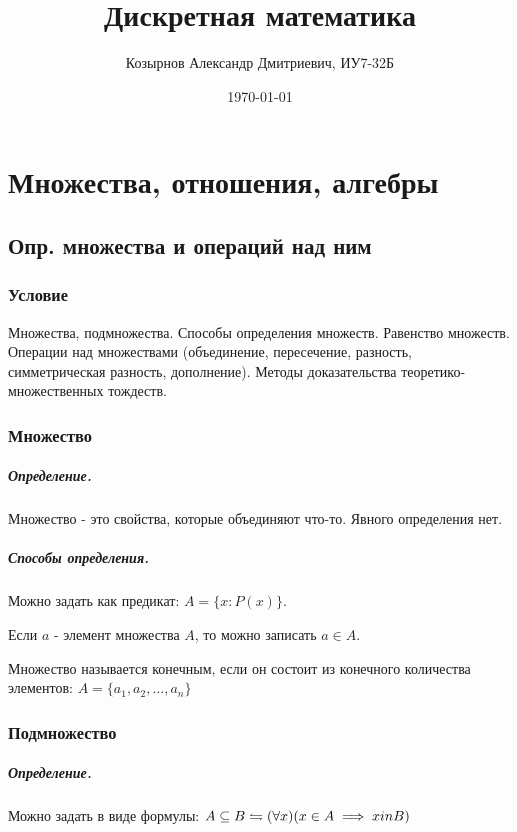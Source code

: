\documentclass{report}
\title{Дискретная математика}
\author{Козырнов Александр Дмитриевич, ИУ7-32Б}
\date{\today}
\begin{document}
\maketitle
\tableofcontents
\newpage

\chapter{Множества, отношения, алгебры}
\section{Опр. множества и операций над ним}

\subsection{Условие}
Множества, подмножества. Способы определения множеств. Равенство множеств.
Операции над множествами (объединение, пересечение, разность, симметрическая
разность, дополнение). Методы доказательства теоретико-множественных тождеств.

\subsection{Множество}
\paragraph*{Определение.}
Множество - это свойства, которые объединяют что-то. Явного определения нет.

\paragraph*{Способы определения.}
Можно задать как предикат: $A = \{x: P(x)\} $.

\medskip

Если $a$ - элемент множества  $A$, то можно записать  $a \in A$.

Множество называется конечным, если он состоит из конечного количества элементов:
$A = \{a_1,a_2,\ldots,a_{n}\} $

\subsection{Подмножество}
\paragraph*{Определение.}
Можно задать в виде формулы: $A \subseteq B \leftrightharpoons
(\forall x)(x \in  A \implies x \\in  B)$
\end{document}

